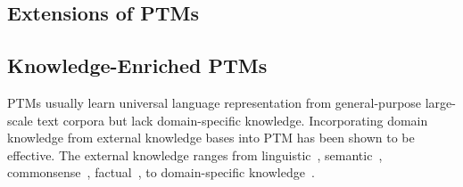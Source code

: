 \documentclass[fleqn]{SCYE-arxiv}
\begin{document}
\begin{multicols}{2}
\section{Extensions of PTMs}
\label{sec:extension}


\subsection{Knowledge-Enriched PTMs}
\label{sec:ptms-knowledge}



PTMs usually learn universal language representation from general-purpose large-scale text corpora but lack domain-specific knowledge. Incorporating domain knowledge from external knowledge bases into PTM has been shown to be effective.
The external knowledge ranges from linguistic~\cite{Lauscher2019informing,ke2019sentilr,peters2019knowledge,wang2020kadapter}, semantic~\cite{levine2019sensebert}, commonsense~\cite{guan2020knowledge}, factual~\cite{zhang2019ernie,peters2019knowledge,liu2019kbert,xiong2019pretrain,wang2019kepler}, to domain-specific knowledge~\cite{he2019integrating,liu2019kbert}.


\end{multicols}
\end{document}
